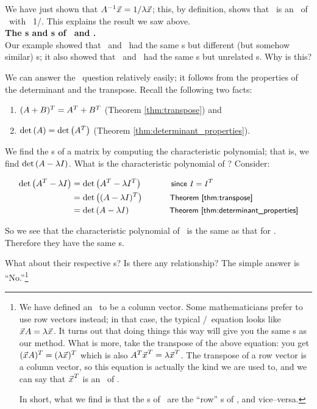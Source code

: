 We have just shown that $A^{-1}\vec{x_{}} = 1/\lambda\vec{x_{}}$; this, by definition, shows that \vx\ is an \ev\ of \ttai\ with \el\ 1/\lda. This explains the result we saw above.\\

\noindent \textsf{\textbf{The \el s and \ev s of \tta\ and \ttat.}}\\

Our example showed that \tta\ and \ttat\ had the same \el s but different (but somehow similar) \ev s; it also showed that \ttb\ and \ttbt\ had the same \el s but unrelated \ev s. Why is this?

We can answer the \el\ question relatively easily; it follows from the properties of the determinant and the transpose. Recall the following two facts:
	\begin{enumerate}
	\item		$(A +B)^T = A^T + B^T$ (Theorem \ref{thm:transpose}) and 
	\item		$\text{det}\left(A\right) = \text{det}\left(A^T\right)$ (Theorem \ref{thm:determinant_properties}).
	\end{enumerate}
	
We find the \el s of a matrix by computing the characteristic polynomial; that is, we find $\text{det}\left(A - \lambda I\right)$. What is the characteristic polynomial of \ttat? Consider:

\begin{align*}
\text{det}\left(A^T - \lambda I\right) & = \text{det}\left(A^T - \lambda I^T\right) \textsf{\hskip 34 pt \small since $I = I^T$} \\
 & = \text{det}\left((A - \lambda I)^T\right)  \textsf{\hskip 31 pt\small Theorem \ref{thm:transpose}} \\
 & = \text{det}\left(A-\lambda I\right)   \textsf{\hskip 46 pt \small Theorem \ref{thm:determinant_properties}}\\
\end{align*} 

So we see that the characteristic polynomial of \ttat\ is the same as that for \tta. Therefore they have the same \el s. 

What about their respective \ev s? Is there any relationship? The simple answer is ``No.''\footnote{We have defined an \ev\ to be a column vector. Some mathematicians prefer to use row vectors instead; in that case, the typical \el /\ev\ equation looks like $\vec{x_{}}A=\lambda\vec{x_{}}$. It turns out that doing things this way will give you the same \el s as our method. What is more, take the transpose of the above equation: you get $(\vec{x_{}}A)^T = (\lambda\vec{x_{}})^T$ which is also $A^T\vec{x_{}}^T = \lambda\vec{x_{}}^T$. The transpose of a row vector is a column vector, so this equation is actually the kind we are used to, and we can say that $\vec{x_{}}^T$ is an \ev\ of \ttat. 

In short, what we find is that the \ev s of \ttat\ are the ``row'' \ev s of \tta, and vice--versa.}\\

